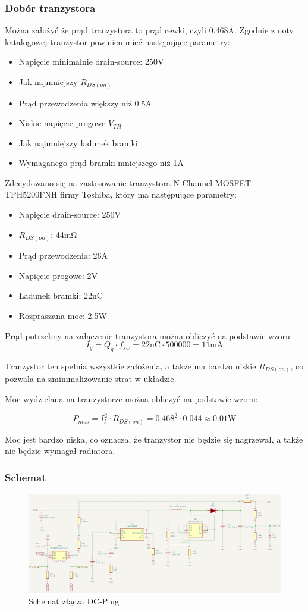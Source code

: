 \documentclass[../../main.tex]{subfiles}
\begin{document}
\subsubsection{Dobór tranzystora}
Można założyć że prąd tranzystora to prąd cewki, czyli 0.468\si{\ampere}.
Zgodnie z noty katalogowej tranzystor powinien mieć następujące parametry:
\begin{itemize}
    \item Napięcie minimalnie drain-source: 250\si{\volt}
    \item Jak najmniejszy $R_{DS(on)}$
    \item Prąd przewodzenia większy niż 0.5\si{\ampere}
    \item Niskie napięcie progowe $V_{TH}$
    \item Jak najmniejszy ładunek bramki
    \item Wymaganego prąd bramki mniejszego niż 1\si{\ampere}
\end{itemize}
\newpage
Zdecydowano się na zastosowanie tranzystora N-Channel
MOSFET TPH5200FNH firmy Toshiba, który ma następujące parametry:
\begin{itemize}
    \item Napięcie drain-source: 250\si{\volt}
    \item $R_{DS(on)}$: 44\si{\milli\ohm}
    \item Prąd przewodzenia: 26\si{\ampere}
    \item Napięcie progowe: 2\si{\volt}
    \item Ładunek bramki: 22\si{\nano\coulomb}
    \item Rozpraszana moc: 2.5\si{\watt}
\end{itemize}

Prąd potrzebny na załączenie tranzystora można obliczyć na podstawie wzoru:
\begin{equation}
    I_{g} = Q_{g} \cdot f_{sw} = 22\si{\nano\coulomb} \cdot 500000 = 11\si{\milli\ampere}
\end{equation}


Tranzystor ten spełnia wszystkie założenia, a także ma bardzo niskie $R_{DS(on)}$, co pozwala na zminimalizowanie strat w układzie.

Moc wydzielana na tranzystorze można obliczyć na podstawie wzoru:

\begin{equation}
    P_{mos} = I_{l}^2 \cdot R_{DS(on)} = 0.468^2 \cdot 0.044 \approx 0.01\si{\watt}
\end{equation}

Moc jest bardzo niska, co oznacza, że tranzystor nie będzie się nagrzewał, a także nie będzie wymagał radiatora.
\subsubsection{Schemat}
\begin{figure}[H]
    \centering
    \includegraphics[width=1.1\textwidth]{schemat.png}
    \caption{Schemat złącza DC-Plug}
\end{figure}
\end{document}
